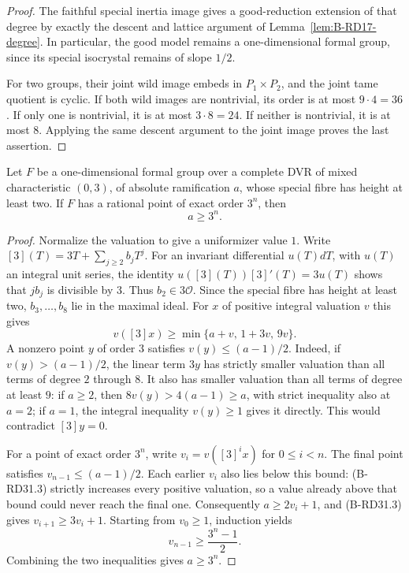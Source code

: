 \begin{proof}
The faithful special inertia image gives a good-reduction
extension of that degree by exactly the descent and lattice
argument of Lemma~\ref{lem:B-RD17-degree}. In particular, the
good model remains a one-dimensional formal group, since its
special isocrystal remains of slope $1/2$.

For two groups, their joint wild image embeds in $P_1\times P_2$,
and the joint tame quotient is cyclic. If both wild images are
nontrivial, its order is at most $9\cdot4=36$. If only one is
nontrivial, it is at most $3\cdot8=24$. If neither is nontrivial,
it is at most $8$. Applying the same descent argument to the
joint image proves the last assertion.
\end{proof}

\begin{lemma}
\label{lem:B-RD31-point}
Let $F$ be a one-dimensional formal group over a complete DVR
of mixed characteristic $(0,3)$, of absolute ramification $a$,
whose special fibre has height at least two. If $F$ has a
rational point of exact order $3^n$, then
\[
                         a\geq3^n.                     \tag{B-RD31.2}
\]
\end{lemma}
\begin{proof}
Normalize the valuation to give a uniformizer value $1$.
Write $[3](T)=3T+\sum_{j\geq2}b_jT^j$. For an invariant
differential $u(T)dT$, with $u(T)$ an integral unit series, the
identity $u([3](T))[3]'(T)=3u(T)$ shows that $j b_j$ is divisible by $3$.
Thus $b_2\in3\mathcal O$. Since the special fibre has height
at least two, $b_3,\ldots,b_8$ lie in the maximal ideal.
For $x$ of positive integral valuation $v$ this gives
\[
 v([3]x)\geq\min\{a+v,\,1+3v,\,9v\}.
                                                        \tag{B-RD31.3}
\]
A nonzero point $y$ of order $3$ satisfies
$v(y)\leq(a-1)/2$. Indeed, if $v(y)>(a-1)/2$, the linear term
$3y$ has strictly smaller valuation than all terms of degree
$2$ through $8$. It also has smaller valuation than all terms
of degree at least $9$: if $a\geq2$, then
$8v(y)>4(a-1)\geq a$, with strict inequality also at $a=2$;
if $a=1$, the integral inequality $v(y)\geq1$ gives it
directly. This would contradict $[3]y=0$.

For a point of exact order $3^n$, write
$v_i=v([3]^i x)$ for $0\leq i<n$. The final point satisfies
$v_{n-1}\leq(a-1)/2$. Each earlier $v_i$ also lies below this
bound: (B-RD31.3) strictly increases every positive valuation,
so a value already above that bound could never reach the
final one. Consequently $a\geq2v_i+1$, and
(B-RD31.3) gives $v_{i+1}\geq3v_i+1$.
Starting from $v_0\geq1$, induction yields
\[
 v_{n-1}\geq\frac{3^n-1}{2}.
\]
Combining the two inequalities gives $a\geq3^n$.
\end{proof}

